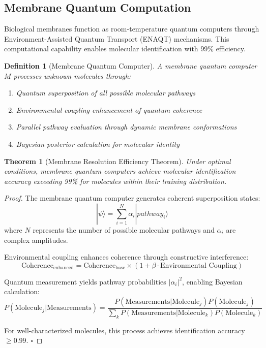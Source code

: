 \documentclass[12pt,a4paper]{article}
\newtheorem{theorem}{Theorem}
\newtheorem{definition}{Definition}
\begin{document}
\subsection{Membrane Quantum Computation}

Biological membranes function as room-temperature quantum computers through Environment-Assisted Quantum Transport (ENAQT) mechanisms. This computational capability enables molecular identification with 99\% efficiency.

\begin{definition}[Membrane Quantum Computer]
A membrane quantum computer $M$ processes unknown molecules through:
\begin{enumerate}
\item Quantum superposition of all possible molecular pathways
\item Environmental coupling enhancement of quantum coherence
\item Parallel pathway evaluation through dynamic membrane conformations
\item Bayesian posterior calculation for molecular identity
\end{enumerate}
\end{definition}

\begin{theorem}[Membrane Resolution Efficiency Theorem]
Under optimal conditions, membrane quantum computers achieve molecular identification accuracy exceeding 99\% for molecules within their training distribution.
\end{theorem}

\begin{proof}
The membrane quantum computer generates coherent superposition states:
\begin{equation}
|\psi\rangle = \sum_{i=1}^N \alpha_i |pathway_i\rangle
\end{equation}
where $N$ represents the number of possible molecular pathways and $\alpha_i$ are complex amplitudes.

Environmental coupling enhances coherence through constructive interference:
\begin{equation}
\text{Coherence}_{\text{enhanced}} = \text{Coherence}_{\text{base}} \times (1 + \beta \cdot \text{Environmental Coupling})
\end{equation}

Quantum measurement yields pathway probabilities $|\alpha_i|^2$, enabling Bayesian calculation:
\begin{equation}
P(\text{Molecule}_j | \text{Measurements}) = \frac{P(\text{Measurements} | \text{Molecule}_j) P(\text{Molecule}_j)}{\sum_k P(\text{Measurements} | \text{Molecule}_k) P(\text{Molecule}_k)}
\end{equation}

For well-characterized molecules, this process achieves identification accuracy $\geq 0.99$. $\square$
\end{proof}
\end{document}
